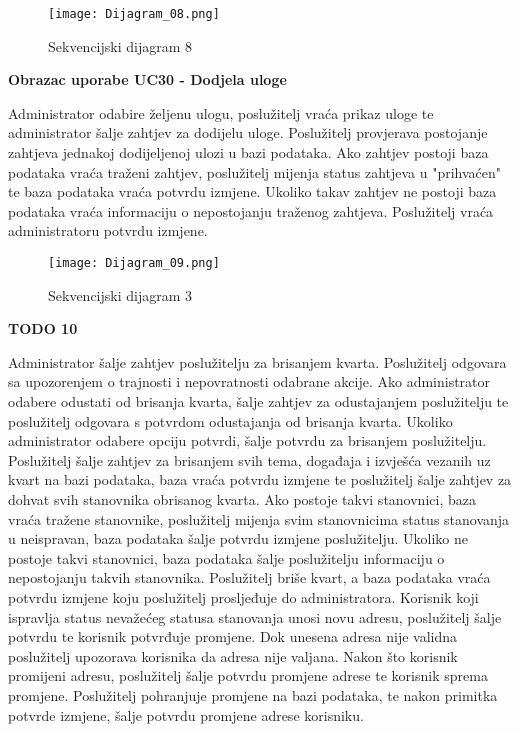 						
				\begin{figure}[H]
					\centering
					\texttt{[image: Dijagram\_08.png]}
					\caption{Sekvencijski dijagram 8}
				\end{figure}		
				\newpage		
		
		\noindent \textbf{Obrazac uporabe UC30 - Dodjela uloge }
			
			
		\noindent Administrator odabire željenu ulogu, poslužitelj vraća prikaz uloge te 							  administrator šalje zahtjev za dodijelu 
				  uloge. Poslužitelj provjerava postojanje zahtjeva jednakoj dodijeljenoj 
				  ulozi u bazi podataka. Ako zahtjev postoji
				  baza podataka vraća traženi zahtjev, poslužitelj mijenja status zahtjeva u 						  "prihvaćen" te baza podataka vraća
                   potvrdu izmjene. Ukoliko takav zahtjev ne postoji baza podataka vraća 								informaciju o nepostojanju traženog 
					zahtjeva. Poslužitelj vraća administratoru potvrdu izmjene.	
						
				\begin{figure}[H]
					\centering
					\texttt{[image: Dijagram\_09.png]}
					\caption{Sekvencijski dijagram 3}
				\end{figure}			
				\newpage	
		\noindent \textbf{TODO 10}
			
			
		\noindent Administrator šalje zahtjev poslužitelju za brisanjem kvarta. Poslužitelj 						odgovara sa upozorenjem o trajnosti 
				i nepovratnosti odabrane akcije. Ako administrator odabere odustati od brisanja 					kvarta, šalje zahtjev za
				odustajanjem poslužitelju te poslužitelj odgovara s potvrdom
 				odustajanja od brisanja kvarta. Ukoliko administrator
				odabere opciju potvrdi, šalje potvrdu za brisanjem poslužitelju. 
				Poslužitelj šalje zahtjev za brisanjem svih tema, događaja 
				i izvješća vezanih uz kvart na bazi podataka, baza vraća potvrdu izmjene te
 				poslužitelj šalje zahtjev za dohvat svih stanovnika obrisanog kvarta. 
 				Ako postoje takvi stanovnici, baza vraća
				tražene stanovnike, poslužitelj mijenja svim stanovnicima status stanovanja u 					neispravan, baza podataka šalje
				potvrdu izmjene poslužitelju. Ukoliko ne postoje takvi stanovnici, baza podataka 					šalje poslužitelju
 				informaciju o nepostojanju takvih stanovnika. Poslužitelj briše kvart, a baza 					podataka vraća potvrdu izmjene koju
				poslužitelj prosljeđuje do administratora. Korisnik koji ispravlja status 						nevažećeg statusa stanovanja
				 unosi novu adresu, poslužitelj šalje potvrdu te korisnik potvrđuje promjene. Dok 				unesena adresa nije validna
				poslužitelj upozorava korisnika da adresa nije valjana. Nakon što korisnik 						promijeni adresu, poslužitelj šalje
				potvrdu promjene adrese te korisnik sprema promjene. Poslužitelj pohranjuje 						promjene na bazi podataka, te nakon
				primitka potvrde izmjene, šalje potvrdu promjene adrese korisniku.
						
